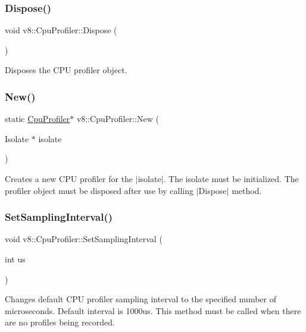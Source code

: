 \subsubsection{\texorpdfstring{Dispose()}{Dispose()}}
{\footnotesize\ttfamily void v8\+::\+Cpu\+Profiler\+::\+Dispose (\begin{DoxyParamCaption}{ }\end{DoxyParamCaption})}

Disposes the C\+PU profiler object. \mbox{\label{classv8_1_1CpuProfiler_a9850aa42c5580c686cde1555f09577aa}} 
\subsubsection{\texorpdfstring{New()}{New()}}
{\footnotesize\ttfamily static \mbox{\hyperlink{classv8_1_1CpuProfiler}{Cpu\+Profiler}}$\ast$ v8\+::\+Cpu\+Profiler\+::\+New (\begin{DoxyParamCaption}\item[{Isolate $\ast$}]{isolate }\end{DoxyParamCaption})\hspace{0.3cm}{\ttfamily [static]}}

Creates a new C\+PU profiler for the $\vert$isolate$\vert$. The isolate must be initialized. The profiler object must be disposed after use by calling $\vert$\+Dispose$\vert$ method. \mbox{\label{classv8_1_1CpuProfiler_ac5b05c72fb899e20adfa7f8cc57f21fb}} 
\subsubsection{\texorpdfstring{Set\+Sampling\+Interval()}{SetSamplingInterval()}}
{\footnotesize\ttfamily void v8\+::\+Cpu\+Profiler\+::\+Set\+Sampling\+Interval (\begin{DoxyParamCaption}\item[{int}]{us }\end{DoxyParamCaption})}

Changes default C\+PU profiler sampling interval to the specified number of microseconds. Default interval is 1000us. This method must be called when there are no profiles being recorded. \mbox{\label{classv8_1_1CpuProfiler_a65ff4a18ab14143e094e2ea189facabd}} 
